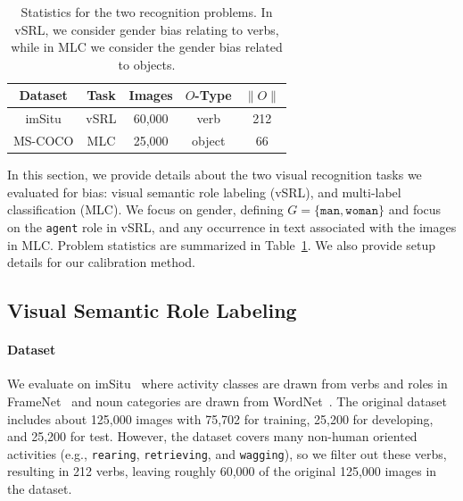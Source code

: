 \begin{table}[t]
\centering
    \begin{tabular}{|@{ }c@{ }|@{ }c@{ }|@{ }c@{ }|@{ }c@{ }|@{ }c@{ }|}
    \hline
    \bf Dataset  & \bf Task &  \bf Images & \bf $O$-Type & \bf $\|O\|$ \\ \hline
        imSitu  &  vSRL  & 60,000 & verb  & 212 \\ \hline
        MS-COCO    & MLC  & 25,000 & object & 66 \\ \hline
    \end{tabular}
    \caption{Statistics for the two recognition problems. In vSRL, we consider gender bias relating to verbs, while in MLC we consider the gender bias related to objects.}
    \label{tab:two_datasets}
\end{table}

In this section, we provide details about the two visual recognition tasks we evaluated for bias: visual semantic role labeling (vSRL), and multi-label classification (MLC). 
We focus on gender, defining $G = \{\texttt{man}, \texttt{woman}\}$ and focus on the \texttt{agent} role in vSRL, and any occurrence in text associated with the images in MLC.
Problem statistics are summarized in Table~\ref{tab:two_datasets}.
We also provide setup details for our calibration method.

\subsection{Visual Semantic Role Labeling}
\paragraph{Dataset}
We evaluate on imSitu~\cite{yatskar2016situation} where activity classes are drawn from verbs and roles in FrameNet~\cite{baker1998berkeley} and noun categories are drawn from WordNet~\cite{MillerBeFeGrMi90}. The original dataset includes about 125,000 images with 75,702 for training, 25,200 for developing, and 25,200 for test. However, the dataset covers many non-human oriented activities (e.g., \texttt{rearing}, \texttt{retrieving}, and \texttt{wagging}), so we filter out these verbs, resulting in 212 verbs, leaving roughly 60,000 of the original 125,000 images in the dataset. 


